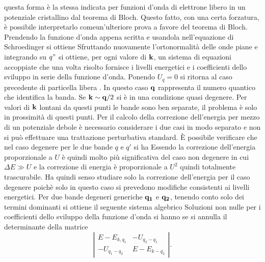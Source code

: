 \documentclass[a4paper,12pt]{article}
\begin{document}
questa forma è la stessa indicata per funzioni d'onda di elettrone libero in un potenziale cristallino dal teorema di Bloch. Questo fatto, con una certa forzatura, è possibile interpretarlo comeun'ulteriore prova a favore del teorema di Bloch. Prendendo la funzione d'onda appena scritta e usandola nell'equazione di Schroedinger si ottiene
Sfruttando nuovamente l'ortonormalità delle onde piane e integrando su $q"$ si ottiene, per ogni valore di $\it\bf k$, un sistema di equazioni accoppiate
che una volta risolto fornisce i livelli energetici e i coefficienti dello sviluppo in serie della funzione d'onda. Ponendo $U_q=0$ si ritorna al caso precedente di particella libera
.
In questo caso $\it\bf q$ rappresenta il numero quantico che identifica la banda. Se ${\it\bf k} \sim {\it\bf q} /2$ si è in una condizione quasi degenere. Per valori di $\it\bf k$ lontani da questi punti le bande sono ben separate, il problema è solo in prossimità di questi punti. Per il calcolo della correzione dell'energia per mezzo di un potenziale debole è necessario considerare i due casi in modo separato e non si può effettuare una trattazione perturbativa standard. \`E possibile verificare che nel caso degenere per le due bande $q$ e $q'$ si ha 
Essendo la correzione dell'energia proporzionale a $U$  è quindi molto più significativa del caso non degenere in cui $\Delta E\gg U$ e la correzione di energia è proporzionale a $U^2$ quindi totalmente trascurabile. Ha quindi senso studiare solo la correzione dell'energia per il caso degenere poichè solo in questo caso si prevedono modifiche consistenti ai livelli energetici.
Per due bande degeneri generiche $\it\bf q_1$ e $\it\bf q_2$, tenendo conto solo dei termini dominanti si ottiene il seguente sistema algebrico
Soluzioni non nulle per i coefficienti dello sviluppo della funzione d'onda si hanno se si annulla il determinante della matrice
\[ \left| \begin{array}{cc}
E-E_{k,q_1} & -U_{q_2-q_1}  \\
-U_{q_1-q_2} & E-E_{k-q_2} \end{array} \right|.\]
\end{document}
